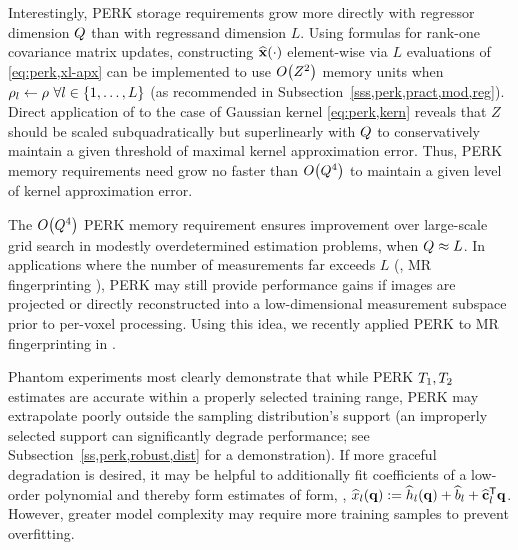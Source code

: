 Interestingly, 
PERK storage requirements
grow more directly with regressor dimension $Q$ 
than with regressand dimension $L$. 
Using formulas for rank-one covariance matrix updates,
constructing $\esta{\bmx}{\cdot}$ element-wise
via $L$ evaluations of \eqref{eq:perk,xl-apx}
can be implemented 
to use $\BigOh{Z^2}$ memory units 
when $\rho_l \gets \rho\,\, \forall l \in \set{1,\dots,L}$
(as recommended in Subsection~\ref{sss,perk,pract,mod,reg}).
Direct application of \cite[Proposition~4]{sutherland:15:ote}
to the case of Gaussian kernel \eqref{eq:perk,kern}
reveals that $Z$ should be scaled 
subquadratically but superlinearly with $Q$ 
to conservatively maintain a given threshold
of maximal kernel approximation error.
Thus, PERK memory requirements need grow no faster than $\BigOh{\dimQ^4}$
to maintain a given level of kernel approximation error.

The $\BigOh{\dimQ^4}$ PERK memory requirement ensures improvement 
over large-scale grid search 
in modestly overdetermined estimation problems, 
\ie when $Q \approx L$.
In applications where 
the number of measurements far exceeds $L$
(\eg, MR fingerprinting \cite{ma:13:mrf}),
PERK may still provide performance gains
if images are projected \cite{mcgivney:14:scf}
or directly reconstructed \cite{asslander:18:lra}
into a low-dimensional measurement subspace
prior to per-voxel processing.
Using this idea,
we recently applied PERK
to MR fingerprinting
in \cite{nataraj:17:slw}.

Phantom experiments most clearly demonstrate
that while PERK $T_1,T_2$ estimates are accurate
within a properly selected training range,
PERK may extrapolate poorly
outside the sampling distribution's support
(an improperly selected support 
can significantly degrade performance; 
see Subsection~\ref{ss,perk,robust,dist} for a demonstration).
If more graceful degradation is desired,
it may be helpful
to additionally fit coefficients 
of a low-order polynomial
and thereby form estimates of form, \eg, 
$\est{x}_l\paren{\bmq} := 
	\est{h}_l\paren{\bmq} + \est{b}_l + \est{\mathbf{c}}_l\tpose \bmq$.
However,
greater model complexity
may require more training samples
to prevent overfitting.

